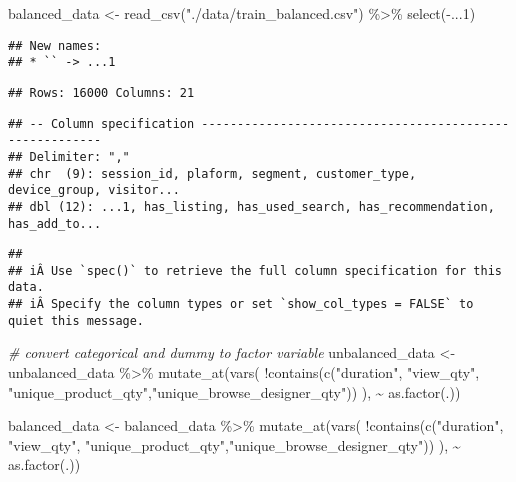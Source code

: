 \documentclass[
]{book}
\newenvironment{Shaded}{\begin{snugshade}}{\end{snugshade}}
\newcommand{\CommentTok}[1]{\textcolor[rgb]{0.56,0.35,0.01}{\textit{#1}}}
\newcommand{\DecValTok}[1]{\textcolor[rgb]{0.00,0.00,0.81}{#1}}
\newcommand{\FunctionTok}[1]{\textcolor[rgb]{0.00,0.00,0.00}{#1}}
\newcommand{\NormalTok}[1]{#1}
\newcommand{\OtherTok}[1]{\textcolor[rgb]{0.56,0.35,0.01}{#1}}
\newcommand{\SpecialCharTok}[1]{\textcolor[rgb]{0.00,0.00,0.00}{#1}}
\newcommand{\StringTok}[1]{\textcolor[rgb]{0.31,0.60,0.02}{#1}}
\begin{document}
\begin{Shaded}
\begin{Highlighting}[]
\NormalTok{balanced\_data }\OtherTok{\textless{}{-}} \FunctionTok{read\_csv}\NormalTok{(}\StringTok{"./data/train\_balanced.csv"}\NormalTok{) }\SpecialCharTok{\%\textgreater{}\%} \FunctionTok{select}\NormalTok{(}\SpecialCharTok{{-}}\NormalTok{...}\DecValTok{1}\NormalTok{)}
\end{Highlighting}
\end{Shaded}

\begin{verbatim}
## New names:
## * `` -> ...1
\end{verbatim}

\begin{verbatim}
## Rows: 16000 Columns: 21
\end{verbatim}

\begin{verbatim}
## -- Column specification --------------------------------------------------------
## Delimiter: ","
## chr  (9): session_id, plaform, segment, customer_type, device_group, visitor...
## dbl (12): ...1, has_listing, has_used_search, has_recommendation, has_add_to...
\end{verbatim}

\begin{verbatim}
## 
## iÂ Use `spec()` to retrieve the full column specification for this data.
## iÂ Specify the column types or set `show_col_types = FALSE` to quiet this message.
\end{verbatim}

\begin{Shaded}
\begin{Highlighting}[]
\CommentTok{\# convert categorical and dummy to factor variable}
\NormalTok{unbalanced\_data }\OtherTok{\textless{}{-}}\NormalTok{ unbalanced\_data }\SpecialCharTok{\%\textgreater{}\%} 
  \FunctionTok{mutate\_at}\NormalTok{(}\FunctionTok{vars}\NormalTok{(}
    \SpecialCharTok{!}\FunctionTok{contains}\NormalTok{(}\FunctionTok{c}\NormalTok{(}\StringTok{"duration"}\NormalTok{, }\StringTok{"view\_qty"}\NormalTok{, }\StringTok{"unique\_product\_qty"}\NormalTok{,}\StringTok{"unique\_browse\_designer\_qty"}\NormalTok{))}
\NormalTok{    ), }\SpecialCharTok{\textasciitilde{}} \FunctionTok{as.factor}\NormalTok{(.))}

\NormalTok{balanced\_data }\OtherTok{\textless{}{-}}\NormalTok{ balanced\_data }\SpecialCharTok{\%\textgreater{}\%} 
  \FunctionTok{mutate\_at}\NormalTok{(}\FunctionTok{vars}\NormalTok{(}
    \SpecialCharTok{!}\FunctionTok{contains}\NormalTok{(}\FunctionTok{c}\NormalTok{(}\StringTok{"duration"}\NormalTok{, }\StringTok{"view\_qty"}\NormalTok{, }\StringTok{"unique\_product\_qty"}\NormalTok{,}\StringTok{"unique\_browse\_designer\_qty"}\NormalTok{))}
\NormalTok{    ), }\SpecialCharTok{\textasciitilde{}} \FunctionTok{as.factor}\NormalTok{(.))}
\end{Highlighting}
\end{Shaded}
\end{document}

